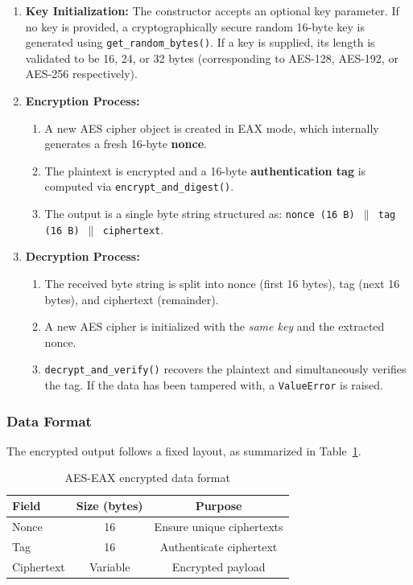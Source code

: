 \documentclass[12pt,a4paper]{article}
\begin{document}
\begin{enumerate}
    \item \textbf{Key Initialization:} The constructor accepts an optional key parameter. If no key is provided, a cryptographically secure random 16-byte key is generated using \texttt{get\_random\_bytes()}. If a key is supplied, its length is validated to be 16, 24, or 32 bytes (corresponding to AES-128, AES-192, or AES-256 respectively).
    
    \item \textbf{Encryption Process:}
    \begin{enumerate}
        \item A new AES cipher object is created in EAX mode, which internally generates a fresh 16-byte \textbf{nonce}.
        \item The plaintext is encrypted and a 16-byte \textbf{authentication tag} is computed via \texttt{encrypt\_and\_digest()}.
        \item The output is a single byte string structured as: \texttt{nonce (16\,B) $\|$ tag (16\,B) $\|$ ciphertext}.
    \end{enumerate}
    
    \item \textbf{Decryption Process:}
    \begin{enumerate}
        \item The received byte string is split into nonce (first 16 bytes), tag (next 16 bytes), and ciphertext (remainder).
        \item A new AES cipher is initialized with the \emph{same key} and the extracted nonce.
        \item \texttt{decrypt\_and\_verify()} recovers the plaintext and simultaneously verifies the tag. If the data has been tampered with, a \texttt{ValueError} is raised.
    \end{enumerate}
\end{enumerate}

\subsubsection{Data Format}
The encrypted output follows a fixed layout, as summarized in Table~\ref{tab:aes-format}.

\begin{table}[H]
\centering
\caption{AES-EAX encrypted data format}
\label{tab:aes-format}
\begin{tabular}{@{}lcc@{}}
\toprule
\textbf{Field} & \textbf{Size (bytes)} & \textbf{Purpose} \\
\midrule
Nonce   & 16 & Ensure unique ciphertexts \\
Tag     & 16 & Authenticate ciphertext \\
Ciphertext & Variable & Encrypted payload \\
\bottomrule
\end{tabular}
\end{table}
\end{document}
